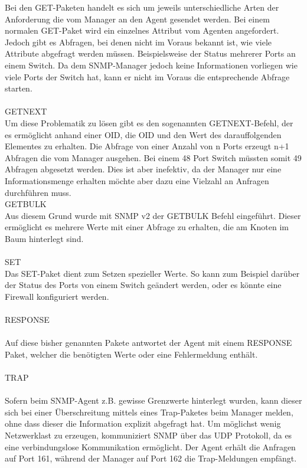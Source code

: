 Bei den GET-Paketen handelt es sich um jeweils unterschiedliche Arten der Anforderung die vom Manager an den Agent gesendet werden.
Bei einem normalen GET-Paket wird ein einzelnes Attribut vom Agenten angefordert. Jedoch gibt es Abfragen, bei denen nicht im Voraus bekannt ist, wie viele Attribute abgefragt werden müssen. Beispielsweise der Status mehrerer Ports an einem Switch. Da dem SNMP-Manager jedoch keine Informationen vorliegen wie viele Ports der Switch hat, kann er nicht im Voraus die entsprechende Abfrage starten.\\
\\
GETNEXT\\

Um diese Problematik zu lösen gibt es den sogenannten GETNEXT-Befehl, der es ermöglicht anhand einer OID, die OID und den Wert des darauffolgenden Elementes zu erhalten.
Die Abfrage von einer Anzahl von n Ports erzeugt n+1 Abfragen die vom Manager ausgehen.
Bei einem 48 Port Switch müssten somit 49 Abfragen abgesetzt werden.
Dies ist aber inefektiv, da der Manager nur eine Informationsmenge erhalten möchte aber dazu eine Vielzahl an Anfragen durchführen muss.
\\
GETBULK\\

Aus diesem Grund wurde mit SNMP v2 der GETBULK Befehl eingeführt. Dieser ermöglicht es mehrere Werte mit einer Abfrage zu erhalten, die am Knoten im Baum hinterlegt sind.\\
\\
SET\\

Das SET-Paket dient zum Setzen spezieller Werte.
So kann zum Beispiel darüber der Status des Ports von einem Switch  geändert werden, oder es könnte eine Firewall konfiguriert werden.
\\
\\
RESPONSE\\
\\
Auf diese bisher genannten Pakete antwortet der Agent mit einem RESPONSE Paket, welcher die benötigten Werte oder eine Fehlermeldung enthält.\\
\\
TRAP\\
\\
Sofern beim SNMP-Agent z.B. gewisse Grenzwerte hinterlegt wurden, kann dieser sich bei einer Überschreitung mittels eines Trap-Paketes beim Manager melden, ohne dass dieser die Information explizit abgefragt hat.
Um möglichst wenig Netzwerklast zu erzeugen, kommuniziert SNMP über das UDP Protokoll, da es eine verbindungslose Kommunikation ermöglicht.
Der Agent erhält die Anfragen auf Port 161, während der Manager auf Port 162 die Trap-Meldungen empfängt.\\





